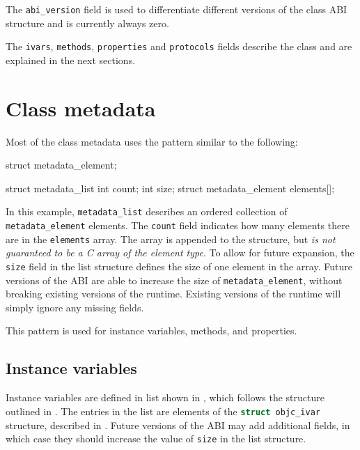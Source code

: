 \documentclass[a4paper]{report}
\newcommand{\ccode}[1]{\lstinline[language={C}]{#1}}
\newcommand{\inccode}[4]{
{
	 }}
	]{../#1}
}
}
\begin{document}
The \ccode{abi_version} field is used to differentiate different versions of the class ABI structure and is currently always zero.

The \ccode{ivars}, \ccode{methods}, \ccode{properties} and \ccode{protocols} fields describe the class and are explained in the next sections.

\inccode{class.h}{class}{objc_class}{The class structure.}

\section{Class metadata}
\label{sec:metadata}

Most of the class metadata uses the pattern similar to the following:

\begin{codesnippet}
struct metadata_element;

struct metadata_list
{
	int count;
	int size;
	struct metadata_element elements[];
}
\end{codesnippet}

In this example, \ccode{metadata_list} describes an ordered collection of \ccode{metadata_element} elements.
The \ccode{count} field indicates how many elements there are in the \ccode{elements} array.
The array is appended to the structure, but \textit{is not guaranteed to be a C array of the element type}.
To allow for future expansion, the \ccode{size} field in the list structure defines the size of one element in the array.
Future versions of the ABI are able to increase the size of \ccode{metadata_element}, without breaking existing versions of the runtime.
Existing versions of the runtime will simply ignore any missing fields.

This pattern is used for instance variables, methods, and properties.

\subsection{Instance variables}

Instance variables are defined in list shown in , which follows the structure outlined in .
The entries in the list are elements of the \ccode{struct objc_ivar} structure, described in .
Future versions of the ABI may add additional fields, in which case they should increase the value of \ccode{size} in the list structure.

\inccode{ivar.h}{ivarlist}{objc_ivar_list}{The instance variable list structure.}
\inccode{ivar.h}{ivar}{objc_ivar}{The instance variable structure.}
\end{document}
